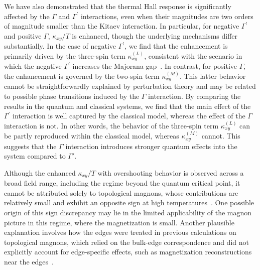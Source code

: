 \documentclass[twocolumn,superscriptaddress,showpacs, longbibliography, aps, prx]{revtex4-2}
\begin{document}
We have also demonstrated that the thermal Hall response is significantly affected by 
the $\Gamma$ and $\Gamma^{\prime}$ interactions, even when their magnitudes are two orders of magnitude smaller than the Kitaev interaction. 
In particular, for negative $\Gamma^{\prime}$ and positive $\Gamma$, $\kappa_{xy}/T$ is enhanced, though the underlying mechanisms differ substantially.
In the case of negative $\Gamma^{\prime}$, we find that the enhancement is primarily driven by the three-spin term $\kappa_{xy}^{(L)}$, consistent with the scenario in which the negative $\Gamma^{\prime}$ increases the Majorana gap~\cite{TakikawaF2020}.
In contrast, for positive $\Gamma$, the enhancement is governed by the two-spin term $\kappa_{xy}^{(M)}$.
This latter behavior cannot be straightforwardly explained by perturbation theory and may be related to possible phase transitions induced by the $\Gamma$ interaction.
By comparing the results in the quantum and classical systems, we find that the main effect of the $\Gamma^{\prime}$ interaction is well captured by the classical model, 
whereas the effect of the $\Gamma$ interaction is not.
In other words, the behavior of the three-spin term $\kappa_{xy}^{(L)}$ 
can be partly reproduced within the classical model, whereas $\kappa_{xy}^{(M)}$ cannot.
This suggests that the $\Gamma$ interaction introduces stronger quantum effects into the system compared to $\Gamma'$.

Although the enhanced $\kappa_{xy}/T$ with overshooting behavior is observed across a broad field range, including the regime beyond the quantum critical point, it cannot be attributed solely to topological magnons, whose contributions are relatively small and exhibit an opposite sign at high temperatures~\cite{ChernZK2021,ZhangCK2021,McClartyDGRPMP2018}.
One possible origin of this sign discrepancy may lie in the limited applicability of the magnon picture in this regime, where the magnetization is small. Another plausible explanation involves how the edges were treated in previous calculations on topological magnons, which relied on the bulk-edge correspondence and did not explicitly account for edge-specific effects, such as magnetization reconstructions near the edges~\cite{KoyamaN2023,HabelMWK2024}. 
\end{document}
